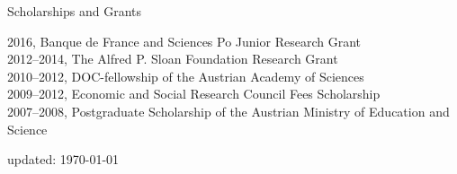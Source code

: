 \documentclass{cvjobmarket} %
\begin{document}











\begin{rSection}{Scholarships and Grants}

{2016, Banque de France and Sciences Po Junior Research Grant}\\
{2012--2014, The Alfred P. Sloan Foundation Research Grant}\\
{2010--2012, DOC-fellowship of the Austrian Academy of Sciences}\\
{2009--2012, Economic and Social Research Council Fees Scholarship}\\
{2007--2008, Postgraduate Scholarship of the Austrian Ministry of Education and Science}

\end{rSection}


updated: \today
\end{document}
